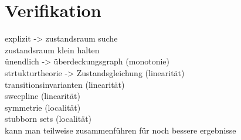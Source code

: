 \chapter{Verifikation}
explizit -> zustandsraum suche\\
zustandsraum klein halten\\
ünendlich -> überdeckungsgraph (monotonie)\\
strtukturtheorie -> Zustandsgleichung (linearität)\\
transitionsinvarianten (linearität)\\
sweepline (linearität)\\
symmetrie (localität)\\
stubborn sets (localität)\\
kann man teilweise zusammenführen für noch bessere ergebnisse\\ 